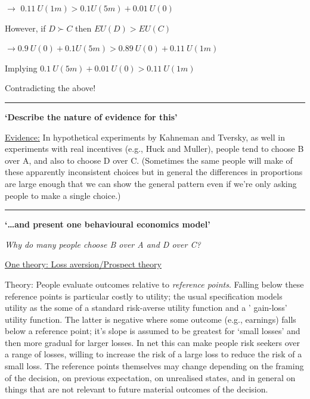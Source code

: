 \documentclass[]{article}
\begin{document}
\(\rightarrow\) \(0.11 \: U(1m) > 0.1 U(5m) + 0.01 \: U(0)\)

\medskip

\bigskip

However, if \(D \succ C\) then \(EU(D)>EU(C)\)

\(\rightarrow 0.9 \: U(0) + 0.1 U(5m) > 0.89 \: U(0) + 0.11 \: U(1m)\)

Implying \(0.1 \: U(5m) + 0.01 \: U(0) > 0.11 \: U(1m)\)

Contradicting the above!

\begin{center}\rule{0.5\linewidth}{\linethickness}\end{center}

\small

\textbf{`Describe the nature of evidence for this'}

\underline{Evidence:} In hypothetical experiments by Kahneman and Tversky, as well in experiments with real incentives (e.g., Huck and Muller), people tend to choose B over A, and also to choose D over C. (Sometimes the same people will make of these apparently inconsistent choices but in general the differences in proportions are large enough that we can show the general pattern even if we're only asking people to make a single choice.)

\begin{center}\rule{0.5\linewidth}{\linethickness}\end{center}

\textbf{`\ldots{}and present one behavioural economics model'}

\textit{Why do many people choose B over A and D over C?}

\bigskip

\underline{One theory: Loss aversion/Prospect theory}

\footnotesize

Theory: People evaluate outcomes relative to \textit{reference points}. Falling below these reference points is particular costly to utility; the usual specification models utility as the some of a standard risk-averse utility function and a ' gain-loss' utility function. The latter is negative where some outcome (e.g., earnings) falls below a reference point; it's slope is assumed to be greatest for `small losses' and then more gradual for larger losses. In net this can make people risk seekers over a range of losses, willing to increase the risk of a large loss to reduce the risk of a small loss. The reference points themselves may change depending on the framing of the decision, on previous expectation, on unrealised states, and in general on things that are not relevant to future material outcomes of the decision.
\end{document}
